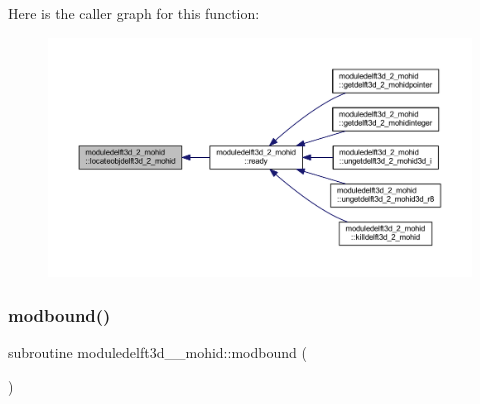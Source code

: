 Here is the caller graph for this function\+:\nopagebreak
\begin{figure}[H]
\begin{center}
\leavevmode
\includegraphics[width=350pt]{namespacemoduledelft3d__2__mohid_a0d0310530ae347fadb6afd0f39d0b3d2_icgraph}
\end{center}
\end{figure}
\mbox{\label{namespacemoduledelft3d__2__mohid_a3fc3c3a94f1ee827e72b2345af34c6b0}} 
\subsubsection{\texorpdfstring{modbound()}{modbound()}}
{\footnotesize\ttfamily subroutine moduledelft3d\+\_\+\_\+mohid\+::modbound (\begin{DoxyParamCaption}{ }\end{DoxyParamCaption})\hspace{0.3cm}{\ttfamily [private]}}


